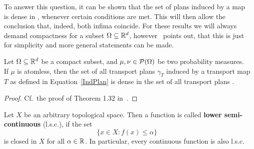 To answer this question, it can be shown that the set of plans induced by a map is dense in \TP{\mu}{\nu}, whenever certain conditions are met. This will then allow the conclusion that, indeed, both infima coincide. For these results we will always demand compactness for a subset $\Omega \subseteq \mathbb{R}^d$, however~\cite{San2015} points out, that this is just for simplicity and more general statements can be made.

	


\begin{theorem}\label{IndPlansDense}
	Let $\Omega \subseteq \mathbb{R}^d$ be a compact subset, and $\mu, \nu \in \mathcal{P}(\Omega)$ be two probability measures. If $\mu$ is atomless, then the set of all transport plans $\gamma_T$ induced by a transport map $T$ as defined in Equation~\ref{IndPlan} is dense in the set of all transport plans \TP{\mu}{\nu}.
\end{theorem}

\begin{proof}
	Cf.~the proof of Theorem 1.32 in~\cite{San2015}.
\end{proof}

\begin{definition}\label{lsc}
	Let $X$ be an arbitrary topological space. Then a function  is called \textbf{lower semi-continuous} (l.s.c.), if the set
	\[ \big\{ x \in X : f(x) \le \alpha \big\} \]
	is closed in $X$ for all $\alpha \in \mathbb{R}$. In particular, every continuous function  is also l.s.c.
\end{definition}

